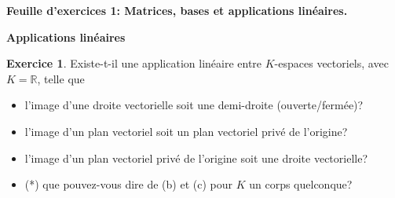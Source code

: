 \documentclass[11pt,a4paper]{article}
\theoremstyle{definition}
\newtheorem{exo}{Exercice}
\newcommand{\R}{\mathbb{R}}
\begin{document}
\vspace*{1pt}
\begin{center}{\bfseries
Feuille d'exercices 1: Matrices, bases et applications linéaires.
}
\end{center}


{\bfseries
Applications linéaires
}

\begin{exo}
Existe-t-il une application linéaire entre $K$-espaces vectoriels, avec $K=\R$, telle que
\begin{itemize}
\item[(a)] l'image d'une droite vectorielle soit une demi-droite (ouverte/fermée)?
\item[(b)] l'image d'un plan vectoriel soit un plan vectoriel privé de l'origine?
\item[(c)] l'image d'un plan vectoriel privé de l'origine soit une droite vectorielle?
\item[(d)] (*) que pouvez-vous dire de (b) et (c) pour $K$ un corps quelconque?
   \end{itemize}
\end{exo}
\end{document}
